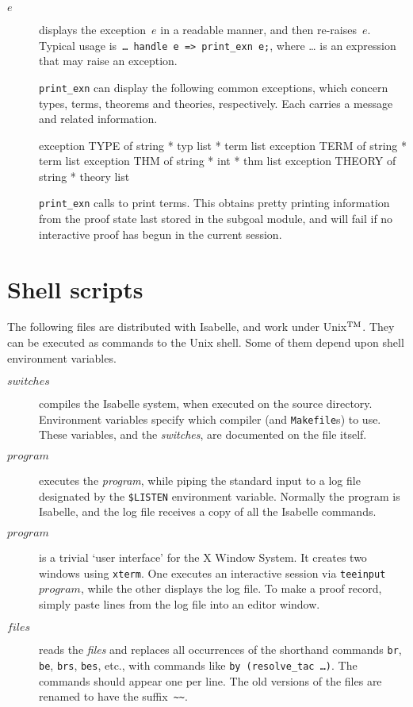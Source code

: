\begin{description}
\item[ $e$] 
displays the exception~$e$ in a readable manner, and then re-raises~$e$.
Typical usage is~\hbox{\tt \ldots{} handle e => print_exn e;}, where
\ldots{} is an expression that may raise an exception.

{\tt print_exn} can display the following common exceptions, which concern
types, terms, theorems and theories, respectively.  Each carries a message
and related information.
\begin{ttbox} 
exception TYPE   of string * typ list * term list
exception TERM   of string * term list
exception THM    of string * int * thm list
exception THEORY of string * theory list
\end{ttbox}
{\tt print_exn} calls  to print terms.  This obtains pretty
printing information from the proof state last stored in the subgoal
module, and will fail if no interactive proof has begun in the current
session.
\end{description}


\section{Shell scripts}
The following files are distributed with Isabelle, and work under
Unix$^{\rm TM}$.  They can be executed as commands to the Unix shell.  Some
of them depend upon shell environment variables.
\begin{description}
\item[ $switches$] 
compiles the Isabelle system, when executed on the source directory.
Environment variables specify which \ML{} compiler (and {\tt Makefile}s) to
use.  These variables, and the {\it switches}, are documented on the file
itself.

\item[ $program$] 
executes the {\it program}, while piping the standard input to a log file
designated by the \verb|$LISTEN| environment variable.  Normally the
program is Isabelle, and the log file receives a copy of all the Isabelle
commands.

\item[ $program$] 
  is a trivial `user interface' for the X Window System.  It creates two
  windows using {\tt xterm}.  One executes an interactive session via
  \hbox{\tt teeinput $program$}, while the other displays the log file.  To
  make a proof record, simply paste lines from the log file into an editor
  window.

\item[ $files$] 
  reads the {\it files\/} and replaces all occurrences of the shorthand
  commands {\tt br}, {\tt be}, {\tt brs}, {\tt bes}, etc., with commands
  like \hbox{\tt by (resolve_tac \ldots)}.  The commands should appear one
  per line.  The old versions of the files
  are renamed to have the suffix~\verb'~~'.
\end{description}

